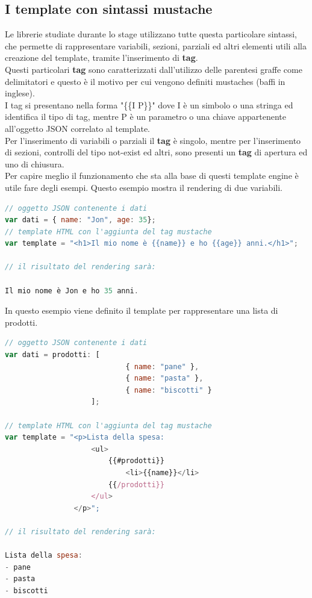\subsection{I template con sintassi mustache}
Le librerie studiate durante lo stage utilizzano tutte questa particolare sintassi, che permette di rappresentare variabili, sezioni, parziali ed altri elementi utili alla creazione del template, tramite l'inserimento di \textbf{tag}.\\
Questi particolari \textbf{tag} sono caratterizzati dall'utilizzo delle parentesi graffe come delimitatori e questo è il motivo per cui vengono definiti mustaches (baffi in inglese).\\
I tag si presentano nella forma "\{\{I P\}\}" dove I è un simbolo o una stringa ed identifica il tipo di tag, mentre P è un parametro o una chiave appartenente all'oggetto JSON correlato al template.\\
Per l'inserimento di variabili o parziali il \textbf{tag} è singolo, mentre per l'inserimento di sezioni, controlli del tipo not-exist ed altri, sono presenti un \textbf{tag} di apertura ed uno di chiusura.\\
Per capire meglio il funzionamento che sta alla base di questi template engine è utile fare degli esempi.
\newpage
Questo esempio mostra il rendering di due variabili.
\begin{lstlisting}[language=JavaScript, caption=Esempio di template rappresentante una variabile.]
// oggetto JSON contenente i dati
var dati = { name: "Jon", age: 35};
// template HTML con l'aggiunta del tag mustache
var template = "<h1>Il mio nome è {{name}} e ho {{age}} anni.</h1>";

// il risultato del rendering sarà:

Il mio nome è Jon e ho 35 anni.
\end{lstlisting}
In questo esempio viene definito il template per rappresentare una lista di prodotti.
\begin{lstlisting}[language=JavaScript, caption=Esempio di template rappresentante una sezione.]
// oggetto JSON contenente i dati
var dati = prodotti: [
    						{ name: "pane" },
    						{ name: "pasta" },
    						{ name: "biscotti" }
  					];
  					
// template HTML con l'aggiunta del tag mustache
var template = "<p>Lista della spesa:
					<ul>
						{{#prodotti}}
							<li>{{name}}</li>
						{{/prodotti}}
					</ul>
				</p>";

// il risultato del rendering sarà:

Lista della spesa:
- pane
- pasta
- biscotti
\end{lstlisting}


